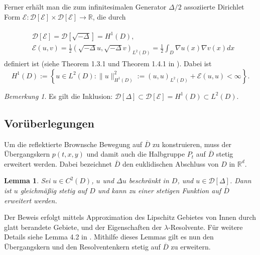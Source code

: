 \documentclass[10pt, a4paper, leqno, twoside, bibliography=totocnumbered, final]{scrartcl}
\theoremstyle{definition}
\theoremstyle{plain}%
\newtheorem{lemma}[defin]{Lemma}
\theoremstyle{remark}
\newtheorem*{bem}{Bemerkung}
\begin{document}
Ferner erhält man die zum infinitesimalen Generator $ \Delta / 2 $ assoziierte Dirichlet Form $ \mathcal{E} : \mathcal{D}[\mathcal{E}] \times \mathcal{D}[\mathcal{E}] \to \mathbb{R} $, die durch

\begin{align}
\label{eq:DirichletForm-Definition}
\begin{split}
& \mathcal{D}[\mathcal{E}] = \mathcal{D}[\sqrt{- \Delta}] = H^1(D), \\
& \mathcal{E}(u,v) = \frac{1}{2} \left( \sqrt{- \Delta} u, \sqrt{- \Delta} v \right)_{L^2(D)} = \frac{1}{2} \int_D \nabla u(x) \nabla v(x) dx
\end{split}
\end{align}
definiert ist (siehe Theorem 1.3.1 und Theorem 1.4.1 in \cite{Fukushima}). Dabei ist
\begin{equation}
\label{eq:H^1(D)-Norm-Definition}
H^1(D) := \left\lbrace u \in L^2(D) : \| u \|_{H^1(D)}^2 := (u,u)_{L^2(D)} + \mathcal{E}(u,u) < \infty  \right\rbrace .
\end{equation}

\begin{bem}
Es gilt die Inklusion: $ \mathcal{D}[\Delta] \subset \mathcal{D}[\mathcal{E}] = H^1(D) \subset L^2(D) $.
\end{bem}



\subsection{Vorüberlegungen}


Um die reflektierte Brownsche Bewegung auf $ \overline{D} $ zu konstruieren, muss der Übergangskern $ p(t,x,y) $ und damit auch die Halbgruppe $ P_t $ auf $ \overline{D} $ stetig erweitert werden. Dabei bezeichnet $ \overline{D} $ den euklidischen Abschluss von $ D $ in $ \mathbb{R}^d $.

\begin{lemma}
Sei $ u \in C^2(D) $,  $u$ und $\Delta u$ beschränkt in $D$, und $ u \in \mathcal{D}[\Delta] $. Dann ist $u$ gleichmäßig stetig auf $D$ und kann zu einer stetigen Funktion auf $ \overline{D} $ erweitert werden.
\end{lemma}

Der Beweis erfolgt mittels Approximation des Lipschitz Gebietes von Innen durch glatt berandete Gebiete, und der Eigenschaften der $ \lambda $-Resolvente. Für weitere Details siehe Lemma 4.2 in \cite{Bass-Hsu}. Mithilfe dieses Lemmas gilt es nun den Übergangskern und den Resolventenkern stetig auf $ \overline{D} $ zu erweitern. 
\end{document}
